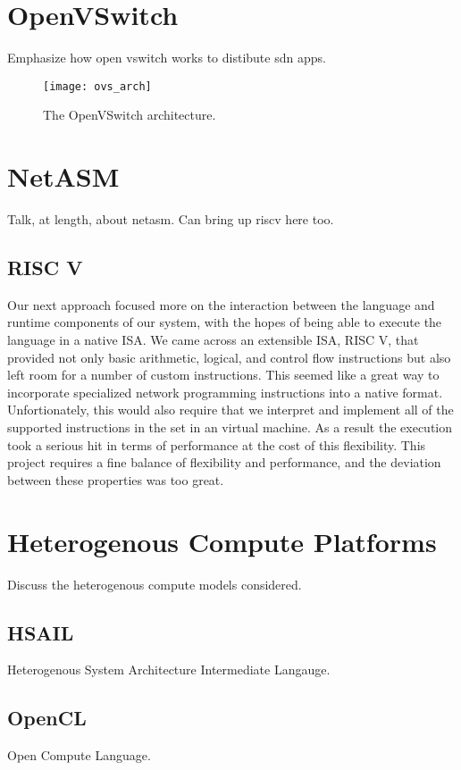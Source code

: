 \section{OpenVSwitch}
\label{related:ovs}
Emphasize how open vswitch works to distibute sdn apps.
\begin{figure}[h]
\centering
\texttt{[image: ovs\_arch]}
\caption{The OpenVSwitch architecture.}
\label{related:ovs_arch}
\end{figure}

\section{NetASM}
\label{related:netasm}
Talk, at length, about netasm. Can bring up riscv here too.

\subsection{RISC V}
Our next approach focused more on the interaction between the language and
runtime components of our system, with the hopes of being able to execute
the language in a native ISA. We came across an extensible ISA, RISC V, that
provided not only basic arithmetic, logical, and control flow instructions but
also left room for a number of custom instructions. This seemed like a great
way to incorporate specialized network programming instructions into a native
format. Unfortionately, this would also require that we interpret and implement
all of the supported instructions in the set in an virtual machine. As a result
the execution took a serious hit in terms of performance at the cost of this
flexibility. This project requires a fine balance of flexibility and
performance, and the deviation between these properties was too great.

\section{Heterogenous Compute Platforms}
\label{related:hcp}
Discuss the heterogenous compute models considered.

\subsection{HSAIL}
\label{related:hcp:hsail}
Heterogenous System Architecture Intermediate Langauge.

\subsection{OpenCL}
\label{related:hcp:ocl}
Open Compute Language.

